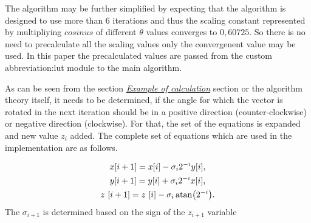 \documentclass[a4paper, twoside, 11pt]{article}
\begin{document}
            The algorithm may be further simplified by expecting that the algorithm is designed to use more than 6 iterations and thus the scaling constant represented by multipliying $cosinus$ of different $\theta$ values converges to $0,60725$. So there is no need to precalculate all the scaling values only the convergenent value may be used. In this paper the precalculated values are passed from the custom \gls{abbreviation:lut} module to the main algorithm.\par
            As can be seen from the section \hyperref[subsubsec:example-of-calculation]{\textit{Example of calculation}} section or the algorithm theory itself, it needs to be determined, if the angle for which the vector is rotated in the next iteration should be in a positive direction (counter-clockwise) or negative direction (clockwise). For that, the set of the equations is expanded and new value $z_i$ added. The complete set of equations which are used in the implementation are as follows.

            \begin{equation}
                \begin{gathered}
                x [i+1] = x [i] - \sigma_i 2^{-i} y[i],\\
                y [i+1] = y [i] + \sigma_i 2^{-i} x[i],\\
                z~[i+1] = z~[i] - \sigma_i \atan (2^{-i}).
                \end{gathered}
            \end{equation}
            The $\sigma_{i+1}$ is determined based on the sign of the $z_{i+1}$ variable
\end{document}
